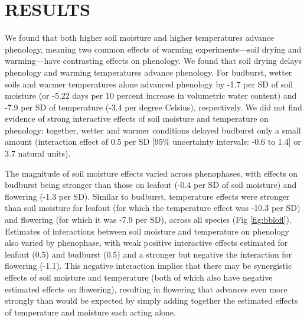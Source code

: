 \documentclass{article}
\begin{document}
\section* {RESULTS}
\par We found that both higher soil moisture and higher temperatures advance phenology, meaning two common effects of warming experiments---soil drying and warming---have contrasting effects on phenology. We found that soil drying delays phenology and warming temperatures advance phenology. For budburst, wetter soils and warmer temperatures alone advanced phenology by -1.7 per SD of soil moisture  (or -5.22 days per 10 percent increase in volumetric water content) and -7.9 per SD of temperature (-3.4 per degree Celsius), respectively. We did not find evidence of strong interactive effects of soil moisture and temperature on phenology: together, wetter and warmer conditions delayed budburst only a small amount (interaction effect of 0.5 per SD [95\% uncertainty intervals: -0.6 to 1.4] or 3.7 natural units). 
\par The magnitude of soil moisture effects varied across phenophases, with effects on budburst being stronger than those on leafout (-0.4 per SD of soil moisture) and flowering (-1.3 per SD). Similar to budburst, temperature effects were stronger than soil moisture for leafout (for which the temperature effect was -10.3 per SD) and flowering (for which it was -7.9 per SD), across all species (Fig \ref{fig:bblofl}). Estimates of interactions between soil moisture and temperature on phenology also varied by phenophase, with weak positive interactive effects estimated for leafout (0.5) and budburst (0.5) and a stronger but negative the interaction for flowering (-1.1). This negative interaction implies that there may be synergistic effects of soil moisture and temperature (both of which also have negative estimated effects on flowering), resulting in flowering that advances even more strongly than would be expected by simply adding together the  estimated effects of temperature and  moisture each acting alone. 
\end{document}
